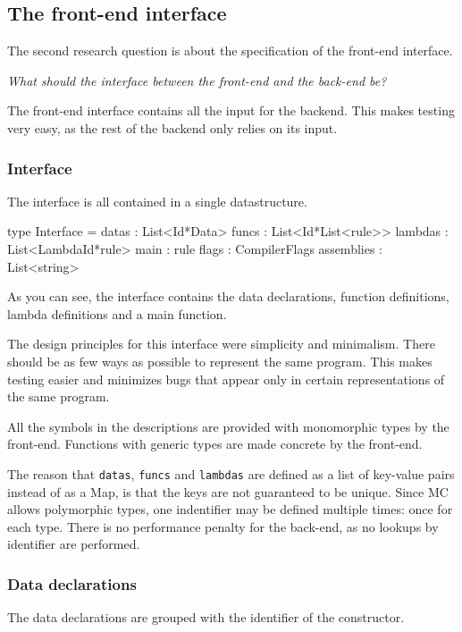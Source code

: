 \subsection{The front-end interface}
The second research question is about the specification of the front-end interface.

\textit{What should the interface between the front-end and the back-end be?}

The front-end interface contains all the input for the backend.
This makes testing very easy, as the rest of the backend only relies on its input.

\subsubsection{Interface}
The interface is all contained in a single datastructure.

\begin{FS}
type Interface = {
  datas      : List<Id*Data>
  funcs      : List<Id*List<rule>>
  lambdas    : List<LambdaId*rule>
  main       : rule
  flags      : CompilerFlags
  assemblies : List<string> 
}
\end{FS}

As you can see, the interface contains the data declarations, function definitions, lambda definitions and a main function.

The design principles for this interface were simplicity and minimalism.
There should be as few ways as possible to represent the same program.
This makes testing easier and minimizes bugs that appear only in certain representations of the same program.

All the symbols in the descriptions are provided with monomorphic types by the front-end.
Functions with generic types are made concrete by the front-end.

The reason that \texttt{datas}, \texttt{funcs} and \texttt{lambdas} are defined as a list of key-value pairs instead of as a Map, is that the keys are not guaranteed to be unique.
Since MC allows polymorphic types, one indentifier may be defined multiple times: once for each type.
There is no performance penalty for the back-end, as no lookups by identifier are performed.

\subsubsection{Data declarations}
The data declarations are grouped with the identifier of the constructor.

